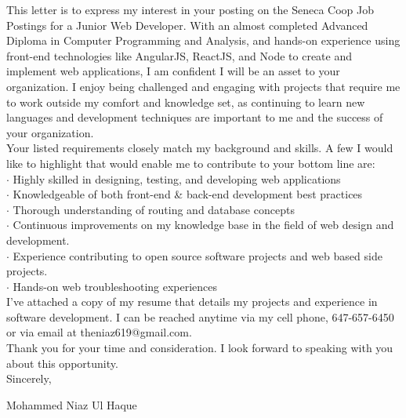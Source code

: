 \documentclass[a4paper]{article}
\begin{document}
\linebreak
This letter is to express my interest in your posting on the Seneca Coop Job Postings for a Junior Web Developer. With an almost completed Advanced Diploma in Computer Programming and Analysis, and hands-on experience using front-end technologies like AngularJS, ReactJS, and Node to create and implement web applications, I am confident I will be an asset to your organization.\linebreak
\linebreak
I enjoy being challenged and engaging with projects that require me to work outside my comfort and knowledge set, as continuing to learn new languages and development techniques are important to me and the success of your organization.\linebreak\\\linebreak
\linebreak
Your listed requirements closely match my background and skills. A few I would like to highlight that would enable me to contribute to your bottom line are:\linebreak\\\linebreak
\linebreak
$\cdot$ Highly skilled in designing, testing, and developing web applications\\
$\cdot$ Knowledgeable of both front-end \& back-end development best practices\\
$\cdot$ Thorough understanding of routing and database concepts\\
$\cdot$ Continuous improvements on my knowledge base in the field of web design and development.\\
$\cdot$ Experience contributing to open source software projects and web based side projects.\\
$\cdot$ Hands-on web troubleshooting experiences\linebreak\\

I’ve attached a copy of my resume that details my projects and experience in software development. I can be reached anytime via my cell phone, 647-657-6450 or via email at theniaz619@gmail.com.\linebreak\\\linebreak
\linebreak
Thank you for your time and consideration. I look forward to speaking with you about this opportunity.\linebreak\\\linebreak\linebreak
\linebreak
Sincerely,\linebreak

Mohammed Niaz Ul Haque\linebreak


\ 
\end{document}
